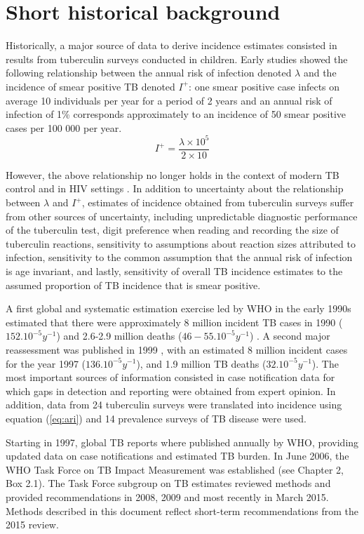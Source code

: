 \section{Short historical background}

Historically, a major source of data to derive incidence estimates consisted in results from tuberculin surveys conducted in children\cite{Styblo1985}. Early studies showed  the following relationship between the annual risk of infection denoted $\lambda$ and the incidence of smear positive TB denoted $I^+$: one smear positive case infects on average 10 individuals per year for a period of 2 years and an annual risk of infection of 1\% corresponds approximately to an incidence of 50 smear positive cases per 100 000 per year.
\begin{equation}
\label{eq:ari}
I^+ = \frac{\lambda \times 10^5}{2 \times 10}
\end{equation}

However, the above relationship no longer holds in the context of modern TB control and in HIV settings \cite{18235886}. In addition to uncertainty about the relationship between $\lambda$ and $I^+$, estimates of incidence obtained from tuberculin surveys suffer from other sources of uncertainty, including unpredictable diagnostic performance of the tuberculin test, digit preference when reading and recording the size of tuberculin reactions, sensitivity to assumptions about reaction sizes attributed to infection, sensitivity to the common assumption that the annual risk of infection is age invariant, and lastly, sensitivity of overall TB incidence estimates to the assumed proportion of TB incidence that is smear positive. 

A first global and systematic estimation exercise led by WHO in the early 1990s estimated that there were approximately 8 million incident TB cases in 1990 ($152.10^{-5} y^{-1}$) and 2.6-2.9 million deaths ($46-55.10^{-5} y^{-1}$) \cite{1600578}. A second major reassessment was published in 1999 \cite{10517722}, with an estimated 8 million incident  cases for the year 1997 ($136.10^{-5} y^{-1}$), and 1.9 million TB deaths ($32.10^{-5} y^{-1}$). The most important sources of information consisted in case notification data for which gaps in detection and reporting were obtained from expert opinion. In addition, data from 24 tuberculin surveys were translated into incidence using equation (\ref{eq:ari}) and 14 prevalence surveys of TB disease were used.

Starting in 1997, global TB reports where published annually by WHO, providing updated data on case notifications and estimated TB burden. In June 2006, the WHO Task Force on TB Impact Measurement was established \cite{18201929} (see Chapter 2, Box 2.1). The Task Force subgroup on TB estimates reviewed methods and provided recommendations in 2008, 2009 and most recently in March 2015. Methods described in this document reflect short-term recommendations from the 2015 review. 




  
  
  
  
  
  
  
  
  
  
  